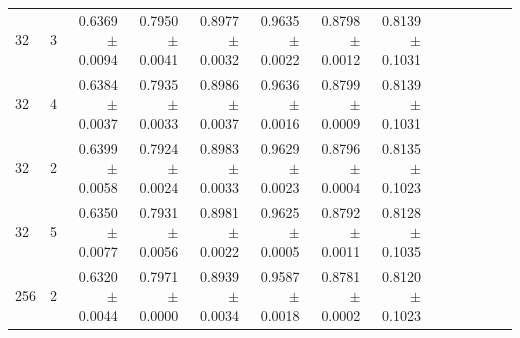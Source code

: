 \begin{table}
\begin{center}
{\begin{tabular}{llrrrrrrrrrrrr}
					32 &	3 &	0.6369	$\pm$	0.0094	&	0.7950	$\pm$	0.0041	&	0.8977	$\pm$	0.0032	&	0.9635	$\pm$	0.0022	&	0.8798	$\pm$	0.0012	&	0.8139	$\pm$	0.1031	\\
					32 &	4 &	0.6384	$\pm$	0.0037	&	0.7935	$\pm$	0.0033	&	0.8986	$\pm$	0.0037	&	0.9636	$\pm$	0.0016	&	0.8799	$\pm$	0.0009	&	0.8139	$\pm$	0.1031	\\
					32 &	2 &	0.6399	$\pm$	0.0058	&	0.7924	$\pm$	0.0024	&	0.8983	$\pm$	0.0033	&	0.9629	$\pm$	0.0023	&	0.8796	$\pm$	0.0004	&	0.8135	$\pm$	0.1023	\\
					32 &	5 &	0.6350	$\pm$	0.0077	&	0.7931	$\pm$	0.0056	&	0.8981	$\pm$	0.0022	&	0.9625	$\pm$	0.0005	&	0.8792	$\pm$	0.0011	&	0.8128	$\pm$	0.1035	\\
					256 &	2 &	0.6320	$\pm$	0.0044	&	0.7971	$\pm$	0.0000	&	0.8939	$\pm$	0.0034	&	0.9587	$\pm$	0.0018	&	0.8781	$\pm$	0.0002	&	0.8120	$\pm$	0.1023	\\
				\bottomrule
				\end{tabular}}
				\npnoround
				  \end{center}
			\end{table}


